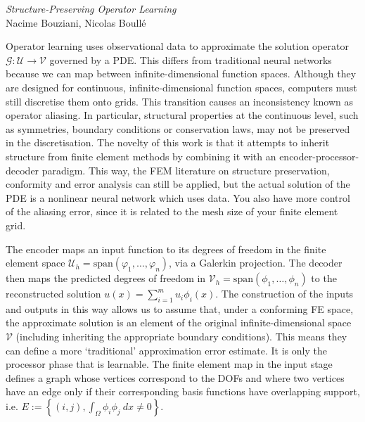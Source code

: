 \documentclass{article}
\begin{document}
\vspace{2cm}

\begin{center}
    \textit{Structure-Preserving Operator Learning} \\
    Nacime Bouziani, Nicolas Boull\'e \cite{bouziani2024}
\end{center}

Operator learning uses observational data to approximate the solution operator $\mathcal{G}: \mathcal{U} \to \mathcal{V}$ governed by a PDE. This differs from traditional neural networks because we can map between infinite-dimensional function spaces. Although they are designed for continuous, infinite-dimensional function spaces, computers must still discretise them onto grids. This transition causes an inconsistency known as operator aliasing. In particular, structural properties at the continuous level, such as symmetries, boundary conditions or conservation laws, may not be preserved in the discretisation. The novelty of this work is that it attempts to inherit structure from finite element methods by combining it with an encoder-processor-decoder paradigm. This way, the FEM literature on structure preservation, conformity and error analysis can still be applied, but the actual solution of the PDE is a nonlinear neural network which uses data. You also have more control of the aliasing error, since it is related to the mesh size of your finite element grid. \newline

The encoder maps an input function to its degrees of freedom in the finite element space $\mathcal{U}_h = \text{span}(\varphi_1, \ldots, \varphi_n)$, via a Galerkin projection. The decoder then maps the predicted degrees of freedom in $\mathcal{V}_h = \text{span}(\phi_1, \ldots, \phi_n)$ to the reconstructed solution $u(x) = \sum_{i=1}^m u_i \phi_i(x)$. The construction of the inputs and outputs in this way allows us to assume that, under a conforming FE space, the approximate solution is an element of the original infinite-dimensional space $\mathcal{V}$ (including inheriting the appropriate boundary conditions). This means they can define a more `traditional' approximation error estimate. It is only the processor phase that is learnable. The finite element map in the input stage defines a graph whose vertices correspond to the DOFs and where two vertices have an edge only if their corresponding basis functions have overlapping support, i.e. $E := \left\{(i,j), \int_\Omega \phi_i \phi_j \ dx \neq 0 \right\}$. \newline
\end{document}
